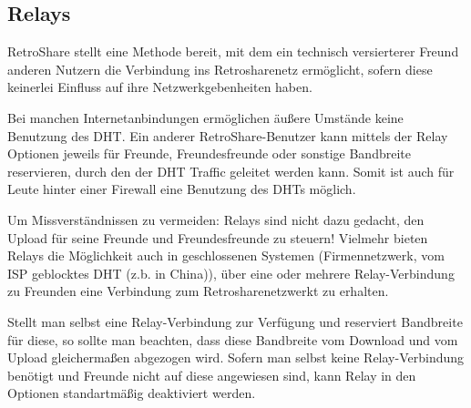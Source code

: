 \subsection{Relays}
RetroShare stellt eine Methode bereit, mit dem ein technisch versierterer Freund anderen Nutzern die Verbindung ins Retrosharenetz ermöglicht, sofern diese keinerlei Einfluss auf ihre Netzwerkgebenheiten haben. 

Bei manchen Internetanbindungen ermöglichen äußere Umstände keine Benutzung des DHT. Ein anderer RetroShare-Benutzer kann mittels der Relay Optionen jeweils für Freunde, Freundesfreunde oder sonstige Bandbreite reservieren, durch den der DHT Traffic geleitet werden kann. Somit ist auch für Leute hinter einer Firewall eine Benutzung des DHTs möglich.

Um Missverständnissen zu vermeiden: Relays sind nicht dazu gedacht, den Upload für seine Freunde und Freundesfreunde zu steuern! Vielmehr bieten Relays die Möglichkeit auch in geschlossenen Systemen (Firmennetzwerk, vom ISP geblocktes DHT (z.b. in China)), über eine oder mehrere Relay-Verbindung zu Freunden eine Verbindung zum Retrosharenetzwerkt zu erhalten.


Stellt man selbst eine Relay-Verbindung zur Verfügung und reserviert Bandbreite für diese, so sollte man beachten, dass diese Bandbreite vom Download und vom Upload gleichermaßen abgezogen wird.
Sofern man selbst keine Relay-Verbindung benötigt und Freunde nicht auf diese angewiesen sind, kann Relay in den Optionen standartmäßig deaktiviert werden.
